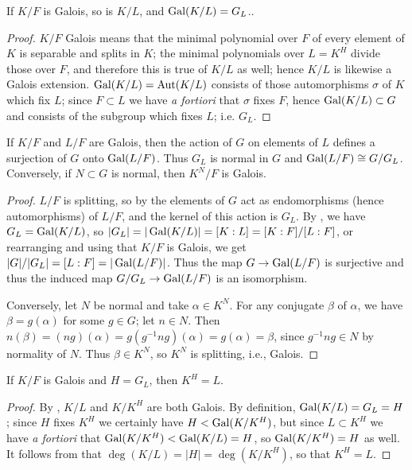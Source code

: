 \begin{lemma} If $K/F$ is Galois, so is $K/L$, and $\operatorname{\text{Gal}}(K/L) = G_L$..
\label{sub_galois}
\end{lemma}

\begin{proof} $K/F$ Galois means that the minimal polynomial over $F$ of every
element of $K$ is separable and splits in $K$; the minimal polynomials over $L
= K^H$ divide those over $F$, and therefore this is true of $K/L$ as well;
hence $K/L$ is likewise a Galois extension. $\operatorname{\text{Gal}}(K/L) = \operatorname{\text{Aut}}(K/L)$ consists
of those automorphisms $\sigma$ of $K$ which fix $L$; since $F \subset L$ we
have \emph{a fortiori} that $\sigma$ fixes $F$, hence $\operatorname{\text{Gal}}(K/L) \subset G$
and consists of the subgroup which fixes $L$; i.e. $G_L$. \end{proof}

\begin{corollary} If $K/F$ and $L/F$ are Galois, then the action of $G$ on elements of $L$
defines a surjection of $G$ onto $\operatorname{\text{Gal}}(L/F)$.  Thus $G_L$ is normal in $G$ and $\operatorname{\text{Gal}}(L/F) \cong G/G_L$.  Conversely, if $N \subset G$ is normal, then $K^N/F$ is Galois.
\label{normal}
\end{corollary}

\begin{proof} $L/F$ is splitting, so by  the elements of $G$
act as endomorphisms (hence automorphisms) of $L/F$, and the kernel of this action is $G_L$.  By
, we have $G_L = \operatorname{\text{Gal}}(K/L)$, so $|G_L| = |\operatorname{\text{Gal}}(K/L)| = [K : L] = [K : F] / [L : F]$,
or rearranging and using that $K/F$ is Galois, we get $|G|/|G_L| = [L : F] =
|\operatorname{\text{Gal}}(L/F)|$.  Thus the map $G \to \operatorname{\text{Gal}}(L/F)$ is surjective and thus the induced map $G/G_L \to
\operatorname{\text{Gal}}(L/F)$ is an isomorphism.

Conversely, let $N$ be normal and take $\alpha \in K^N$.  For any conjugate $\beta$ of $\alpha$, we
have $\beta = g(\alpha)$ for some $g \in G$; let $n \in N$.  Then $n(\beta) = (ng)(\alpha) =
g(g^{-1} n g)(\alpha) = g(\alpha) = \beta$, since $g^{-1} n g \in N$ by normality of $N$.  Thus
$\beta \in K^N$, so $K^N$ is splitting, i.e., Galois. \end{proof}

\begin{proposition} If $K/F$ is Galois and $H = G_L$, then $K^H = L$.
\label{fixed_field}
\end{proposition}

\begin{proof} By , $K/L$ and $K/K^H$ are both Galois.  By
definition, $\operatorname{\text{Gal}}(K/L) = G_L = H$; since $H$ fixes $K^H$ we certainly have
$H < \operatorname{\text{Gal}}(K/K^H)$, but since $L \subset K^H$ we have \emph{a fortiori} that
$\operatorname{\text{Gal}}(K/K^H) < \operatorname{\text{Gal}}(K/L) = H$, so $\operatorname{\text{Gal}}(K/K^H) = H$ as well.  It follows
from  that $\deg(K/L) = |H| = \deg(K/K^H)$, so that $K^H =
L$. \end{proof}

